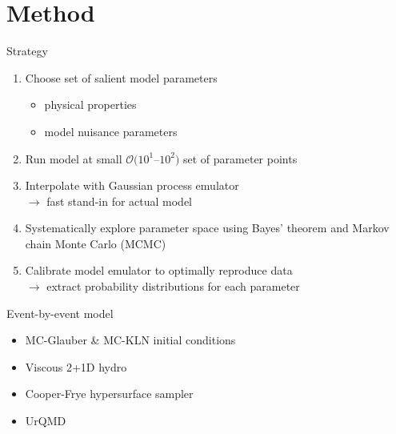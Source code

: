 \documentclass{beamer}
\begin{document}
\section{Method}

\begin{frame}{Strategy}
  \begin{enumerate}
    \item Choose set of salient model parameters
      \begin{itemize}
        \item physical properties
        \item model nuisance parameters
      \end{itemize}
    \item Run model at small $\mathcal O(10^1$--$10^2)$ set of parameter points
    \item Interpolate with Gaussian process emulator \\
      $\rightarrow$ fast stand-in for actual model
    \item Systematically explore parameter space using Bayes' theorem and Markov chain Monte Carlo (MCMC)
    \item Calibrate model emulator to optimally reproduce data \\
      $\rightarrow$ extract probability distributions for each parameter
  \end{enumerate}
\end{frame}


\begin{frame}{Event-by-event model}
    \begin{itemize}
      \item MC-Glauber \& MC-KLN initial conditions \\
        \smallskip
      \item Viscous 2+1D hydro \\
        \smallskip
      \item Cooper-Frye hypersurface sampler \\
        \smallskip
      \item UrQMD \\
         \\[-1ex]
    \end{itemize}
\end{frame}
\end{document}
